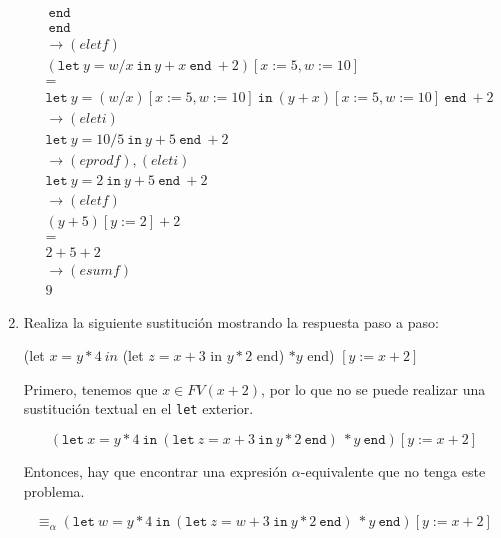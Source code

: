 \documentclass{article}
\begin{document}
\begin{enumerate}
{\begin{enumerate}
{\begin{align*}
                &\ \texttt{end} \ \\
                &\ \texttt{end} \ \\
                &\rightarrow (eletf) \\
                &(\texttt{let} \ y = w / x \ \texttt{in} \ y + x \ \texttt{end} \  + 2)
                [x := 5, w := 10]\\
                &= \\
                &\texttt{let} \ y = (w / x)[x := 5, w := 10] \ \texttt{in} \ 
                (y + x) [x := 5, w := 10] \ \texttt{end} \  + 2 \\
                &\rightarrow (eleti) \\
                &\texttt{let} \ y = 10 / 5 \ \texttt{in} \ y + 5\ \texttt{end} \  + 2 \\
                &\rightarrow (eprodf), (eleti) \\
                &\texttt{let} \ y = 2 \ \texttt{in} \ y + 5\ \texttt{end} \  + 2 \\
                &\rightarrow (eletf) \\
                &(y+5)[y:=2] + 2 \\
                &= \\
                & 2 + 5 + 2 \\
                &\rightarrow (esumf) \\
                & 9
            \end{align*}
        	
        	}
            \end{enumerate}
        }
    	\item {
    	Realiza la siguiente sustitución mostrando la respuesta paso a paso:
    	
        (let  $x = y \ast 4 \ in$ (let $z = x + 3$  in  $y \ast 2$ end) $\ast y $ end) $[y := x + 2]$

        Primero, tenemos que $x \in FV(x + 2)$, por lo que no se puede realizar
        una sustitución textual en el \texttt{let} exterior.

        \[
            (\texttt{let} \ x = y \ast 4 \ \texttt{in} \ 
            (\texttt{let} \ z = x + 3 \ \texttt{in} \ 
            y \ast 2 \ \texttt{end}) \ \ast y \ \texttt{end}) 
            [y := x + 2]
        \]

        Entonces, hay que encontrar una expresión $\alpha$-equivalente que no
        tenga este problema.

        \[
            \equiv_{\alpha}
            (\texttt{let} \ w = y \ast 4 \ \texttt{in} \ 
            (\texttt{let} \ z = w + 3 \ \texttt{in} \ 
            y \ast 2 \ \texttt{end}) \ \ast y \ \texttt{end}) 
            [y := x + 2]
        \]

}
\end{enumerate}
\end{document}
